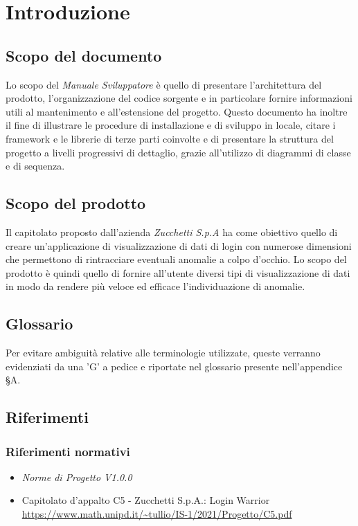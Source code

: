 \chapter{Introduzione}

\section{Scopo del documento}
Lo scopo del \textit{Manuale Sviluppatore} è quello di presentare l’architettura del prodotto, l’organizzazione del codice sorgente e in particolare fornire informazioni utili al mantenimento
e all’estensione del progetto. Questo documento ha inoltre il fine di illustrare le procedure di installazione e di sviluppo in locale, citare i framework e le librerie di terze 
parti coinvolte e di presentare la struttura del progetto a livelli progressivi di dettaglio, grazie all’utilizzo di diagrammi di classe e di sequenza.

\section{Scopo del prodotto}
Il capitolato proposto dall'azienda \textit{Zucchetti S.p.A} ha come obiettivo quello di creare un'applicazione di visualizzazione di dati di login con numerose dimensioni che permettono 
di rintracciare eventuali anomalie a colpo d'occhio. Lo scopo del prodotto è quindi quello di fornire all'utente diversi tipi di visualizzazione di dati in modo da rendere 
più veloce ed efficace l'individuazione di anomalie.

\section{Glossario}
Per evitare ambiguità relative alle terminologie utilizzate, queste verranno evidenziati da una 'G' a pedice e riportate nel glossario presente nell'appendice §A.

\section{Riferimenti}
\subsection{Riferimenti normativi}
\begin{itemize}
    \item \textit{Norme di Progetto V1.0.0}
    \item Capitolato d'appalto C5 - Zucchetti S.p.A.: Login Warrior \\
    \url{https://www.math.unipd.it/~tullio/IS-1/2021/Progetto/C5.pdf}
\end{itemize}

